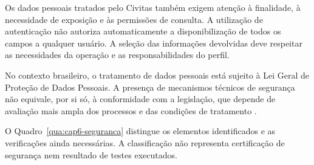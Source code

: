 Os dados pessoais tratados pelo Civitas também exigem atenção à finalidade, à necessidade de exposição e às permissões de consulta. A utilização de autenticação não autoriza automaticamente a disponibilização de todos os campos a qualquer usuário. A seleção das informações devolvidas deve respeitar as necessidades da operação e as responsabilidades do perfil.

No contexto brasileiro, o tratamento de dados pessoais está sujeito à Lei Geral de Proteção de Dados Pessoais. A presença de mecanismos técnicos de segurança não equivale, por si só, à conformidade com a legislação, que depende de avaliação mais ampla dos processos e das condições de tratamento \parencite{brasil2018lgpd}.

O Quadro~\ref{qua:cap6-seguranca} distingue os elementos identificados e as verificações ainda necessárias. A classificação não representa certificação de segurança nem resultado de testes executados.

